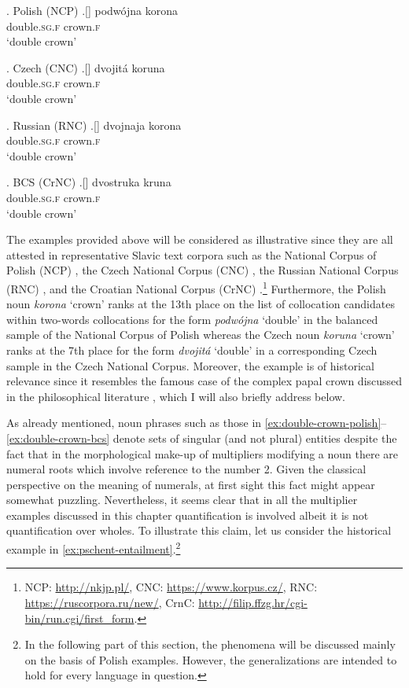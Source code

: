 \ex. Polish (NCP)\label{ex:double-crown-polish}
\bg.[] podwójna korona\\
double\textsc{.sg.f} crown\textsc{.f}\\
`double crown'

\ex. Czech (CNC)\label{ex:double-crown-czech}
\bg.[] dvojitá	koruna\\
double\textsc{.sg.f} crown\textsc{.f}\\
`double crown'

\ex. Russian (RNC)\label{ex:double-crown-russian}
\bg.[] dvojnaja	korona\\
double\textsc{.sg.f} crown\textsc{.f}\\
`double crown'

\ex. BCS (CrNC)\label{ex:double-crown-bcs}
\bg.[] dvostruka kruna\\
double\textsc{.sg.f} crown\textsc{.f}\\
`double crown'

The examples provided above will be considered as illustrative since they are all attested in representative Slavic text corpora such as the National Corpus of Polish (NCP) \citep{przepiorkowski_et-al2012narodowy}, the Czech National Corpus (CNC) \citep{kren_et-al2020syn2020}, the Russian National Corpus (RNC) \citep{apresjan_et-al2006syntactically}, and the Croatian National Corpus (CrNC) \citep{tadic2009new}.\footnote{NCP: \url{http://nkjp.pl/}, CNC: \url{https://www.korpus.cz/}, RNC: \url{https://ruscorpora.ru/new/}, CrnC: \url{http://filip.ffzg.hr/cgi-bin/run.cgi/first_form}.} Furthermore, the Polish noun \textit{korona} `crown' ranks at the 13th place on the list of collocation candidates within two-words collocations for the form \textit{podwójna} `double' in the balanced sample of the National Corpus of Polish whereas the Czech noun \textit{koruna} `crown' ranks at the 7th place for the form \textit{dvojitá} `double' in a corresponding Czech sample in the Czech National Corpus. Moreover, the example is of historical relevance since it resembles the famous case of the complex papal crown discussed in the philosophical literature \citep[see][p. 70]{wiggins1980sameness}, which I will also briefly address below.

As already mentioned, noun phrases such as those in \ref{ex:double-crown-polish}--\ref{ex:double-crown-bcs} denote sets of singular (and not plural) entities despite the fact that in the morphological make-up of multipliers modifying a noun there are numeral roots which involve reference to the number 2. Given the classical perspective on the meaning of numerals, at first sight this fact might appear somewhat puzzling. Nevertheless, it seems clear that in all the multiplier examples discussed in this chapter quantification is involved albeit it is not quantification over wholes. To illustrate this claim, let us consider the historical example in \ref{ex:pschent-entailment}.\footnote{In the following part of this section, the phenomena will be discussed mainly on the basis of Polish examples. However, the generalizations are intended to hold for every language in question.} 

